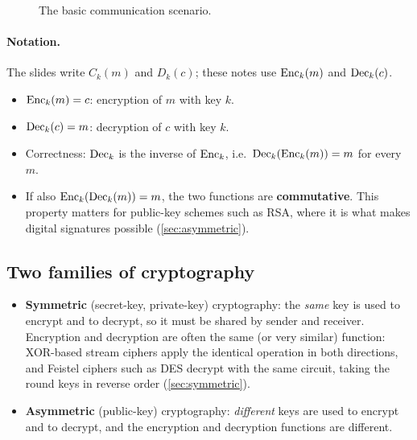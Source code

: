 \begin{figure}[H]
\centering
{}
\caption{The basic communication scenario.}
\label{fig:comm-scenario}
\end{figure}

\paragraph{Notation.} The slides write $C_k(m)$ and $D_k(c)$; these notes use $\operatorname{Enc}_k(m)$ and $\operatorname{Dec}_k(c)$.
\begin{itemize}
    \item $\operatorname{Enc}_k(m) = c$: encryption of $m$ with key $k$.
    \item $\operatorname{Dec}_k(c) = m$: decryption of $c$ with key $k$.
    \item Correctness: $\operatorname{Dec}_k$ is the inverse of $\operatorname{Enc}_k$, i.e.\ $\operatorname{Dec}_k(\operatorname{Enc}_k(m)) = m$ for every $m$.
    \item If also $\operatorname{Enc}_k(\operatorname{Dec}_k(m)) = m$, the two functions are \textbf{commutative}. This property matters for public-key schemes such as RSA, where it is what makes digital signatures possible (\cref{sec:asymmetric}).
\end{itemize}

\subsection{Two families of cryptography}

\begin{definition}
\leavevmode
\begin{itemize}
    \item \textbf{Symmetric} (secret-key, private-key) cryptography: the \emph{same} key is used to encrypt and to decrypt, so it must be shared by sender and receiver. Encryption and decryption are often the same (or very similar) function: XOR-based stream ciphers apply the identical operation in both directions, and Feistel ciphers such as DES decrypt with the same circuit, taking the round keys in reverse order (\cref{sec:symmetric}).
    \item \textbf{Asymmetric} (public-key) cryptography: \emph{different} keys are used to encrypt and to decrypt, and the encryption and decryption functions are different.
\end{itemize}
\end{definition}


